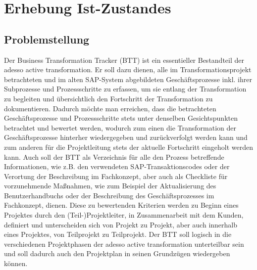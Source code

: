 \section{Erhebung Ist-Zustandes}
\label{kap:istzustand}
\subsection{Problemstellung}
Der Business Transformation Tracker (BTT) ist ein essentieller Bestandteil der adesso active transformation. Er soll dazu dienen, alle im Transformationsprojekt betrachteten und im alten SAP-System abgebildeten Geschäftsprozesse inkl. ihrer Subprozesse und Prozessschritte zu erfassen, um sie entlang der Transformation zu begleiten und übersichtlich den Fortschritt der Transformation zu dokumentieren. Dadurch möchte man erreichen, dass die betrachteten Geschäftsprozesse und Prozessschritte stets unter denselben Gesichtspunkten betrachtet und bewertet werden, wodurch zum einen die Transformation der Geschäftsprozesse hinterher wiedergegeben und zurückverfolgt werden kann und zum anderen für die Projektleitung stets der aktuelle Fortschritt eingeholt werden kann. Auch soll der BTT als Verzeichnis für alle den Prozess betreffende Informationen, wie z.B. den verwendeten SAP-Transaktionscodes oder der Verortung der Beschreibung im Fachkonzept, aber auch als Checkliste für vorzunehmende Maßnahmen, wie zum Beispiel der Aktualisierung des Benutzerhandbuchs oder der Beschreibung des Geschäftsprozesses im Fachkonzept, dienen. Diese zu bewertenden Kriterien werden zu Beginn eines Projektes durch den (Teil-)Projektleiter, in Zusammenarbeit mit dem Kunden, definiert und unterscheiden sich von Projekt zu Projekt, aber auch innerhalb eines Projektes, von Teilprojekt zu Teilprojekt. Der BTT soll logisch in die verschiedenen Projektphasen der adesso active transformation unterteilbar sein und soll dadurch auch den Projektplan in seinen Grundzügen wiedergeben können.


